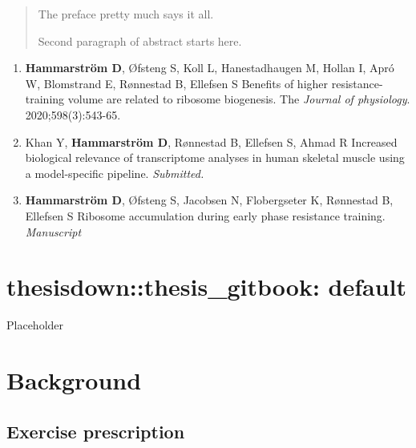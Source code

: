 \documentclass[twoside,10pt]{gihclass} %
\def\labelenumi{\Roman{enumi}.}
\begin{document}
  \begin{abstract}
    The preface pretty much says it all.

    \par

    Second paragraph of abstract starts here.
  \end{abstract}
  \begin{listofpapers}
    \begin{enumerate}
    \def\labelenumi{\Roman{enumi}.}
    \item
      \textbf{Hammarström D}, Øfsteng S, Koll L, Hanestadhaugen M, Hollan I, Apró W, Blomstrand E, Rønnestad B, Ellefsen S Benefits of higher resistance-training volume are related to ribosome biogenesis. The \emph{Journal of physiology}. 2020;598(3):543-65.
    \item
      Khan Y, \textbf{Hammarström D}, Rønnestad B, Ellefsen S, Ahmad R Increased biological relevance of transcriptome analyses in human skeletal muscle using a model-specific pipeline. \emph{Submitted.}
    \item
      \textbf{Hammarström D}, Øfsteng S, Jacobsen N, Flobergseter K, Rønnestad B, Ellefsen S Ribosome accumulation during early phase resistance training. \emph{Manuscript}
    \end{enumerate}
  \end{listofpapers}

  \hypersetup{linkcolor=black}
  \setcounter{tocdepth}{2}
  \tableofcontents

  \listoftables

  \listoffigures




\mainmatter %
\pagestyle{fancyplain} %

\hypertarget{thesisdownthesis_gitbook-default}{%
\chapter{thesisdown::thesis\_gitbook: default}\label{thesisdownthesis_gitbook-default}}

Placeholder

\hypertarget{background}{%
\chapter{Background}\label{background}}

\hypertarget{exercise-prescription}{%
\section{Exercise prescription}\label{exercise-prescription}}
\end{document}
